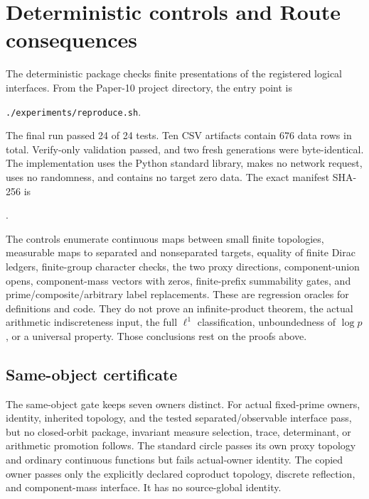 \documentclass[11pt]{article}
\theoremstyle{definition}
\begin{document}
\section{Deterministic controls and Route consequences}
\label{sec:controls}

The deterministic package checks finite presentations of the registered logical interfaces.  From the Paper-10 project directory, the entry point is
\begin{center}
\texttt{./experiments/reproduce.sh}.
\end{center}
The final run passed 24 of 24 tests.  Ten CSV artifacts contain 676 data rows in total.  Verify-only validation passed, and two fresh generations were byte-identical.  The implementation uses the Python standard library, makes no network request, uses no randomness, and contains no target zero data.  The exact manifest SHA-256 is
\begin{center}
\small\ttfamily{}.
\end{center}

The controls enumerate continuous maps between small finite topologies, measurable maps to separated and nonseparated targets, equality of finite Dirac ledgers, finite-group character checks, the two proxy directions, component-union opens, component-mass vectors with zeros, finite-prefix summability gates, and prime/composite/arbitrary label replacements.  These are regression oracles for definitions and code.  They do not prove an infinite-product theorem, the actual arithmetic indiscreteness input, the full $\ell^1$ classification, unboundedness of $\log p$, or a universal property.  Those conclusions rest on the proofs above.

\subsection{Same-object certificate}

The same-object gate keeps seven owners distinct.  For actual fixed-prime owners, identity, inherited topology, and the tested separated/observable interface pass, but no closed-orbit package, invariant measure selection, trace, determinant, or arithmetic promotion follows.  The standard circle passes its own proxy topology and ordinary continuous functions but fails actual-owner identity.  The copied owner passes only the explicitly declared coproduct topology, discrete reflection, and component-mass interface.  It has no source-global identity.
\end{document}

